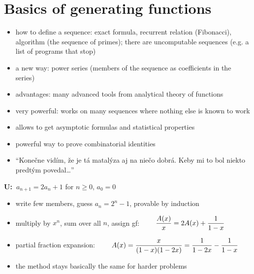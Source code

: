 \documentclass[10pt, a4paper]{article}
\newcommand*\ruleline[1]{\par\noindent\raisebox{.8ex}{\makebox[\linewidth]{\hrulefill\hspace{1ex}\raisebox{-.8ex}{#1}\hspace{1ex}\hrulefill}}}
\def\U{{\bf U:\ }}
\begin{document}

\addtolength{\parskip}{0.5\baselineskip}



\section{Basics of generating functions}

\ruleline{Introduction [Wilf 1--3]}

\begin{itemize}
    \item how to define a sequence: exact formula, recurrent relation (Fibonacci), algorithm (the sequence of primes);
        there are uncomputable sequences (e.g. a list of programs that stop)
    \item a new way: power series (members of the sequence as coefficients in the series)
    \item advantages: many advanced tools from analytical theory of functions
    \item very powerful: works on many sequences where nothing else is known to work
    \item allows to get asymptotic formulas and statistical properties
    \item powerful way to prove combinatorial identities
    \item ``Konečne vidím, že je tá matalýza aj na niečo dobrá. Keby mi to bol niekto predtým povedal\dots''
\end{itemize}

\ruleline{First-order linear recurrences [Wilf 3--7]}

\U $a_{n+1} = 2a_n + 1$ for $n\ge 0$, $a_0 = 0$
\begin{itemize}[label=--]
    \item write few members, guess $a_n = 2^n-1$, provable by induction
    \item multiply by $x^n$, sum over all $n$, assign gf: $\displaystyle \qquad{A(x)\over x}=2A(x)+{1\over 1-x}$
    \item partial fraction expansion: $\displaystyle \qquad A(x)={x\over (1-x)(1-2x)}={1\over 1-2x}-{1\over 1-x}$
    \item the method stays basically the same for harder problems
\end{itemize}
\end{document}
